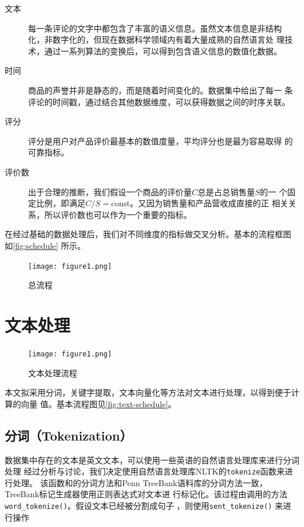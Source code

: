 \begin{description}
    \item [文本] 每一条评论的文字中都包含了丰富的语义信息。虽然文本信息是非结构
        化，非数字化的，但现在数据科学领域内有着大量成熟的{\fKai 自然语言处
        理}技术，通过一系列算法的变换后，可以得到包含语义信息的数值化数据。
    \item [时间] 商品的声誉并非是静态的，而是随着时间变化的。数据集中给出了每一
        条评论的时间戳，通过结合其他数据维度，可以获得数据之间的时序关联。
    \item [评分] 评分是用户对产品评价最基本的数值度量，平均评分也是最为容易取得
        的可靠指标。
    \item [评价数] 出于合理的推断，我们假设一个商品的评价量$C$总是占总销售量$S$的一
        个固定比例，即满足$C/S=\textrm{const}$。又因为销售量和产品营收成直接的正
        相关关系，所以评价数也可以作为一个重要的指标。
\end{description}

在经过基础的数据处理后，我们对不同维度的指标做交叉分析。基本的流程框图
如\autoref{fig:schedule} 所示。

\begin{figure}
    \centering
    \texttt{[image: figure1.png]}
    \caption{总流程}
    \label{fig:schedule}
\end{figure}


\section{文本处理}

\begin{figure}
    \centering
    \texttt{[image: figure1.png]}
    \caption{文本处理流程}
    \label{fig:text-schedule}
\end{figure}

本文拟采用分词，关键字提取，文本向量化等方法对文本进行处理，以得到便于计算的向量
值。基本流程图见\autoref{fig:text-schedule}。

\subsection{分词（Tokenization）}
数据集中存在的文本是英文文本，可以使用一些英语的自然语言处理库来进行分词处理
经过分析与讨论，我们决定使用自然语言处理库NLTK的\texttt{tokenize}函数来进行处理。
该函数和的分词方法和Penn TreeBank语料库的分词方法一致，TreeBank标记生成器使用正则表达式对文本进
行标记化。该过程由调用的方法\texttt{word\_tokenize()}。假设文本已经被分割成句子
，则使用\texttt{sent\_tokenize()}
来进行操作

